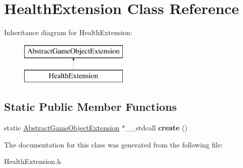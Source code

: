 \hypertarget{class_health_extension}{}\section{Health\+Extension Class Reference}
\label{class_health_extension}
Inheritance diagram for Health\+Extension\+:\begin{figure}[H]
\begin{center}
\leavevmode
\includegraphics[height=2.000000cm]{class_health_extension}
\end{center}
\end{figure}
\subsection*{Static Public Member Functions}
\begin{DoxyCompactItemize}
\item 
\mbox{\label{class_health_extension_a367da40b097a96a692e38ab3a22827b2}} 
static \mbox{\hyperlink{class_abstract_game_object_extension}{Abstract\+Game\+Object\+Extension}} $\ast$\+\_\+\+\_\+stdcall {\bfseries create} ()
\end{DoxyCompactItemize}


The documentation for this class was generated from the following file\+:\begin{DoxyCompactItemize}
\item 
Health\+Extension.\+h\end{DoxyCompactItemize}
